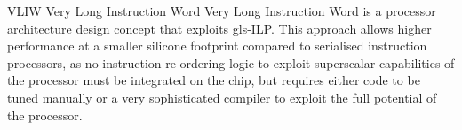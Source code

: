 
%
  {VLIW}%
  {Very Long Instruction Word}%
  {Very Long Instruction Word is a processor architecture design concept that
   exploits \gls{gls-ILP}. This approach allows higher performance at a smaller
   silicone footprint compared to serialised instruction processors, as no
   instruction re-ordering logic to exploit superscalar capabilities of the
   processor must be integrated on the chip, but requires either code to be
   tuned manually or a very sophisticated compiler to exploit the full potential
   of the processor.}%



\glsresetall
\makeglossaries
